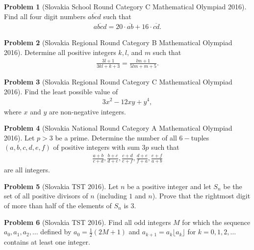 \documentclass[]{article}
\theoremstyle{definition}
\newtheorem{problem}{Problem}
\begin{document}
\begin{problem}[Slovakia School Round Category C Mathematical Olympiad 2016]
	Find all four digit numbers $\overline{abcd}$ such that
		\begin{align*}
			\overline{abcd} = 20 \cdot \overline{ab} + 16 \cdot \overline{cd}.
		\end{align*}
\end{problem}



\begin{problem}[Slovakia Regional Round Category B Mathematical Olympiad 2016]
	Determine all positive integers $k,l$, and $m$ such that
		\begin{align*}
			\frac{3l+1}{3kl+k+3} = \frac{lm + 1}{5lm+m+5}.
		\end{align*}
\end{problem}


\begin{problem}[Slovakia Regional Round Category C Mathematical Olympiad 2016]
	Find the least possible value of
		\begin{align*}
			3x^2 - 12xy + y^4,
		\end{align*}
	where $x$ and $y$ are non-negative integers.
\end{problem}


\begin{problem}[Slovakia National Round Category A Mathematical Olympiad 2016]
	Let $p>3$ be a prime. Determine the number of all $6-$tuples $(a,b,c,d,e,f)$ of positive integers with sum $3p$ such that
		\begin{align*}
			\frac{a+b}{c+d}, \frac{b+c}{d+e}, \frac{c+d}{e+f}, \frac{d+e}{f+a}, \frac{e+f}{a+b}
		\end{align*}
	are all integers.
\end{problem}


\begin{problem}[Slovakia TST 2016]
	Let $n$ be a positive integer and let $S_n$ be the set of all positive divisors of $n$ (including $1$ and $n$). Prove that the rightmost digit of more than half of the elements of $S_n$ is $3$.
\end{problem}



\begin{problem}[Slovakia TST 2016]
	Find all odd integers $M$ for which the sequence $a_0,a_1,a_2,\dots$ defined by $a_0=\frac{1}{2}(2M+1)$ and $a_{k+1} = a_k \lfloor a_k \rfloor$ for $k=0,1,2,\dots$ contains at least one integer.
\end{problem}
\end{document}
